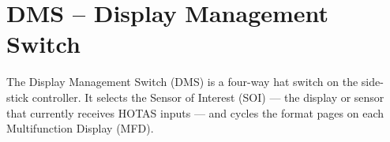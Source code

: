 \documentclass[11pt, a4paper, twoside]{report}
\begin{document}

\chapter{DMS -- Display Management Switch}
\label{chap:C3}

The Display Management Switch (DMS) is a four-way hat switch on the side-stick controller. It selects the Sensor of Interest (SOI) — the display or sensor that currently receives HOTAS inputs — and cycles the format pages on each Multifunction Display (MFD).

\end{document}
